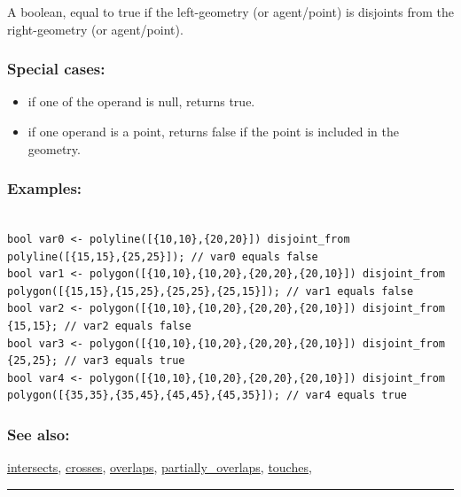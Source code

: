 \documentclass[]{book}
\providecommand{\tightlist}{%
  \setlength{\itemsep}{0pt}\setlength{\parskip}{0pt}}
\theoremstyle{definition}
\theoremstyle{definition}
\theoremstyle{definition}
\theoremstyle{remark}
\begin{document}
A boolean, equal to true if the left-geometry (or agent/point) is
disjoints from the right-geometry (or agent/point).

\subsubsection{Special cases:}\label{special-cases-50}

\begin{itemize}
\tightlist
\item
  if one of the operand is null, returns true.\\
\item
  if one operand is a point, returns false if the point is included in
  the geometry.
\end{itemize}

\subsubsection{Examples:}\label{examples-101}

\begin{verbatim}
 
bool var0 <- polyline([{10,10},{20,20}]) disjoint_from polyline([{15,15},{25,25}]); // var0 equals false 
bool var1 <- polygon([{10,10},{10,20},{20,20},{20,10}]) disjoint_from polygon([{15,15},{15,25},{25,25},{25,15}]); // var1 equals false 
bool var2 <- polygon([{10,10},{10,20},{20,20},{20,10}]) disjoint_from {15,15}; // var2 equals false 
bool var3 <- polygon([{10,10},{10,20},{20,20},{20,10}]) disjoint_from {25,25}; // var3 equals true 
bool var4 <- polygon([{10,10},{10,20},{20,20},{20,10}]) disjoint_from polygon([{35,35},{35,45},{45,45},{45,35}]); // var4 equals true
\end{verbatim}

\subsubsection{See also:}\label{see-also-79}

\href{operators-i-to-m.html\#intersects}{intersects},
\href{operators-b-to-c.html\#crosses}{crosses},
\href{operators-n-to-r.html\#overlaps}{overlaps},
\href{operators-n-to-r.html\#partially_overlaps}{partially\_overlaps},
\href{operators-s-to-z.html\#touches}{touches},

\begin{center}\rule{0.5\linewidth}{\linethickness}\end{center}
\end{document}
